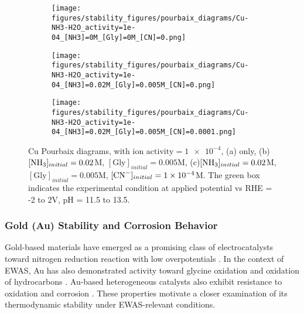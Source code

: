 \documentclass[journal=jacsat,manuscript=article]{achemso}
\begin{document}
\begin{figure}[htbp]
    \centering
    \begin{subfigure}[b]{0.3\textwidth}
        \subcaption{}\label{fig:Cu_Pourbaix_H2O}
        \texttt{[image: figures/stability\_figures/pourbaix\_diagrams/Cu-NH3-H2O\_activity=1e-04\_[NH3]=0M\_[Gly]=0M\_[CN]=0.png]}
    \end{subfigure}
    \begin{subfigure}[b]{0.3\textwidth}
        \subcaption{}\label{fig:Cu_Pourbaix_NH3_Gly}
        \texttt{[image: figures/stability\_figures/pourbaix\_diagrams/Cu-NH3-H2O\_activity=1e-04\_[NH3]=0.02M\_[Gly]=0.005M\_[CN]=0.png]}
    \end{subfigure}
    \begin{subfigure}[b]{0.3\textwidth}
        \subcaption{}\label{fig:Cu_Pourbaix_NH3_Gly_CN}
        \texttt{[image: figures/stability\_figures/pourbaix\_diagrams/Cu-NH3-H2O\_activity=1e-04\_[NH3]=0.02M\_[Gly]=0.005M\_[CN]=0.0001.png]}
    \end{subfigure}
    \caption{Cu Pourbaix diagrams, with $\text{ion activity}=\num{1e-4}$, (a) only, (b)$[\ce{NH3}]_{initial}= 0.02$M, $[\text{Gly}]_{initial}=0.005$M, (c)$[\ce{NH3}]_{initial}= 0.02$M, $[\text{Gly}]_{initial}=0.005$M,  $[\ce{CN-}]_{initial}=\num{1e-4}$M. The green box indicates the experimental condition at applied potential vs RHE = -2 to 2V, pH = 11.5 to 13.5.}
    \label{fig:Cu_Pourbaix}
\end{figure}

\subsubsection{Gold (Au) Stability and Corrosion Behavior}
Gold-based materials have emerged as a promising class of electrocatalysts toward nitrogen reduction reaction with low overpotentials \cite{Ma2021ElectroreductionGold, Shi2017AuConditions, Lee2025FavoringApproach, Bao2017ElectrochemicalCycle}. In the context of EWAS, Au has also demonstrated activity toward glycine oxidation \cite{Sandoval2011AdsorptionStudy, Chen2013AdsorptionStudy, Zou1999GoldIII-inducedGlycine} and oxidation of hydrocarbons \cite{Pina2012UpdateGold, Hughes2005TunableConditions, Scire2012SupportedCompounds}. Au-based heterogeneous catalysts also exhibit resistance to oxidation and corrosion \cite{Gong2009SurfaceGold}. These properties motivate a closer examination of its thermodynamic stability under EWAS-relevant conditions.
\end{document}
